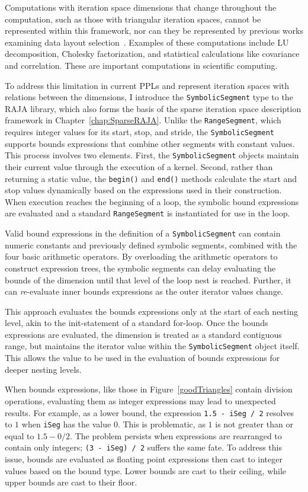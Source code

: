 Computations with iteration space dimensions that change throughout the computation, such as those with triangular iteration spaces, cannot be represented within this framework, nor can they be represented by previous works examining data layout selection~\cite{kennedy1998automatic}. 
Examples of these computations include LU decomposition, Cholesky factorization, and statistical calculations like covariance and correlation.
These are important computations in scientific computing.

To address this limitation in current PPLs and represent iteration spaces with relations between the dimensions, I introduce the \verb.SymbolicSegment. type to the RAJA library, which also forms the basis of the sparse iteration space description framework in Chapter~\ref{chap:SparseRAJA}. 
Unlike the \verb.RangeSegment., which requires integer values for its start, stop, and stride, the \verb.SymbolicSegment. supports bounds expressions that combine other segments with constant values. 
This process involves two elements.
First, the \verb.SymbolicSegment. objects maintain their current value through the execution of a kernel. 
Second, rather than returning a static value, the \verb.begin(). and \verb.end(). methods calculate the start and stop values dynamically based on the expressions used in their construction. 
When execution reaches the beginning of a loop, the symbolic bound expressions are evaluated and a standard \verb.RangeSegment. is instantiated for use in the loop.

Valid bound expressions in the definition of a \verb.SymbolicSegment. can contain numeric constants and previously defined symbolic segments, combined with the four basic arithmetic operators. 
By overloading the arithmetic operators to construct expression trees, the symbolic segments can delay evaluating the bounds of the dimension until that level of the loop nest is reached.
Further, it can \textit{re}-evaluate inner bounds expressions as the outer iterator values change.

This approach evaluates the bounds expressions only at the start of each nesting level, akin to the init-statement of a standard for-loop.
Once the bounds expressions are evaluated, the dimension is treated as a standard contiguous range, but maintains the iterator value within the \verb.SymbolicSegment. object itself.
This allows the value to be used in the evaluation of bounds expressions for deeper nesting levels.

When bounds expressions, like those in Figure~\ref{goodTriangles} contain division operations, evaluating them as integer expressions may lead to unexpected results. 
For example, as a lower bound, the expression \verb_1.5 - iSeg / 2_ resolves to $1$ when \verb.iSeg. has the value $0$. 
This is problematic, as $1$ is not greater than or equal to $1.5 - 0/2$.
The problem persists when expressions are rearranged to contain only integers; \verb.(3 - iSeg) / 2. suffers the same fate.
To address this issue, bounds are evaluated as floating point expressions then cast to integer values based on the bound type.
Lower bounds are cast to their ceiling, while upper bounds are cast to their floor.

